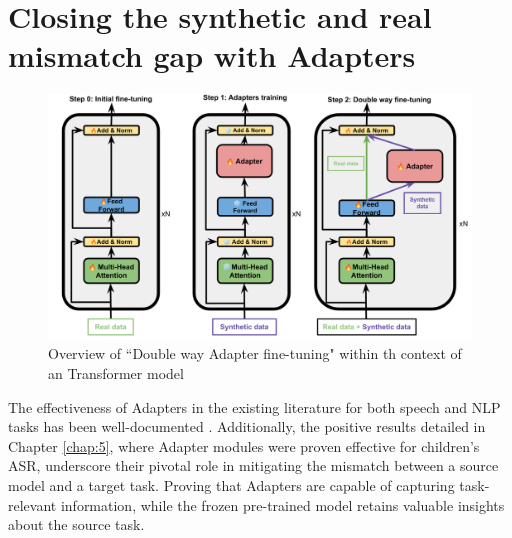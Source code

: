 
\section{Closing the synthetic and real mismatch gap with Adapters}

\begin{figure}
    \centering
    \includegraphics[width=\textwidth]{imgs/TTS_Transformer.png}
    \caption{Overview of ``Double way Adapter fine-tuning"  within th context of an Transformer model}
    \label{fig:overall}
\end{figure}

The effectiveness of Adapters in the existing literature for both speech and NLP tasks has been well-documented \cite{pfeiffer, philip2020monolingual, mao-etal-2022-unipelt}. Additionally, the positive results detailed in Chapter \ref{chap:5}, where Adapter modules were proven effective for children's ASR, underscore their pivotal role in mitigating the mismatch between a source model and a target task. Proving that Adapters are capable of capturing task-relevant information, while the frozen pre-trained model retains valuable insights about the source task.

